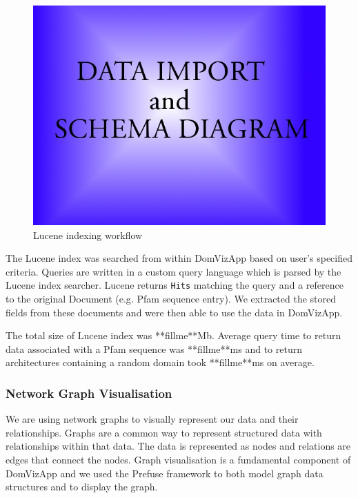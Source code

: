 \begin{figure}[h]
 \begin{center}
 \includegraphics[scale=0.5]{figures/placeholder.jpg}
 \end{center}
 \caption{Lucene indexing workflow}
 \label{luceneworkflow}
\end{figure}

The Lucene index was searched from within DomVizApp based on user's specified criteria. Queries are written in a custom query language which is parsed by the Lucene index searcher. Lucene returns \texttt{Hits} matching the query and a reference to the original Document (e.g. Pfam sequence entry). We extracted the stored fields from these documents and were then able to use the data in DomVizApp.   

The total size of Lucene index was **fillme**Mb. Average query time to return data associated with a Pfam sequence was **fillme**ms and to return architectures containing a random domain took **fillme**ms on average. 

\subsubsection{Network Graph Visualisation}
We are using network graphs to visually represent our data and their relationships. Graphs are a common way to represent structured data with relationships within that data. The data is represented as nodes and relations are edges that connect the nodes. Graph visualisation is a fundamental component of DomVizApp and we used the Prefuse framework to both model graph data structures and to display the graph.

